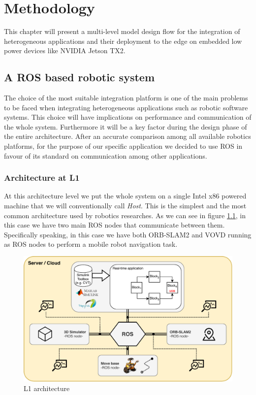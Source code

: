 \chapter{Methodology} \label{chap:methodology}
This chapter will present a multi-level model design flow for the integration of heterogeneous applications and their deployment to the edge on embedded low power devices like NVIDIA Jetson TX2.


\section{A ROS based robotic system}
The choice of the most suitable integration platform is one of the main problems to be faced when integrating heterogeneous applications such as robotic software systems. This choice will have implications on performance and communication of the whole system. Furthermore it will be a key factor during the design phase of the entire architecture.
After an accurate comparison among all available robotics platforms, for the purpose of our specific application we decided to use ROS \cite{ROS} in favour of its standard on communication among other applications.

\subsection{Architecture at L1}
At this architecture level we put the whole system on a single Intel x86 powered machine that we will conventionally call \textit{Host}. 
This is the simplest and the most common architecture used by robotics researches. As we can see in figure \ref{fig:l1arch}, in this case we have two main ROS nodes that communicate between them. Specifically speaking, in this case we have both ORB-SLAM2 and VOVD \cite{VOVD} running as ROS nodes to perform a mobile robot navigation task.

\begin{figure}
	\centering
	\includegraphics[width=\textwidth]{images/L1_arch}
	\caption{L1 architecture}
	\label{fig:l1arch}
\end{figure}

